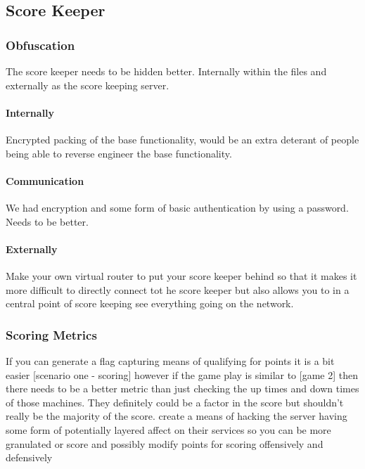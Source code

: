 \documentclass[10pt]{article}
\begin{document}
\subsection{Score Keeper}

\subsubsection{Obfuscation}
The score keeper needs to be hidden better. Internally within the files and externally
as the score keeping server.

\paragraph*{Internally}
Encrypted packing of the base functionality, would be an extra deterant of people being
able to reverse engineer the base functionality.

\paragraph*{Communication}
We had encryption and some form of basic authentication by using a password.
Needs to be better.

\paragraph*{Externally}
Make your own virtual router to put your score keeper behind so that it makes it
more difficult to directly connect tot he score keeper but also allows you to in a central
point of score keeping see everything going on the network.

\subsubsection{Scoring Metrics}
If you can generate a flag capturing means of qualifying for points it is a bit easier
[scenario one - scoring] however if the game play is similar to [game 2] then there
needs to be a better metric than just checking the up times and down times of those machines.
They definitely could be a factor in the score but shouldn't really be the majority of the score.
create a means of hacking the server having some form of potentially layered affect on their
services so you can be more granulated or score and possibly modify points for scoring
offensively and defensively
\end{document}
